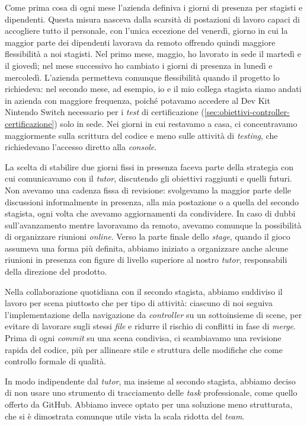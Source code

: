 Come prima cosa di ogni mese l'azienda definiva i giorni di presenza per stagisti e dipendenti. Questa misura nasceva dalla scarsità di postazioni di lavoro capaci di accogliere tutto il personale, con l'unica eccezione del venerdì, giorno in cui la maggior parte dei dipendenti lavorava da remoto offrendo quindi maggiore flessibilità a noi stagisti. Nel primo mese, maggio, ho lavorato in sede il martedì e il giovedì; nel mese successivo ho cambiato i giorni di presenza in lunedì e mercoledì. L'azienda permetteva comunque flessibilità quando il progetto lo richiedeva: nel secondo mese, ad esempio, io e il mio collega stagista siamo andati in azienda con maggiore frequenza, poiché potavamo accedere al Dev Kit Nintendo Switch necessario per i \textit{test} di certificazione (\ref{sec:obiettivi-controller-certificazione}) solo in sede. Nei giorni in cui restavamo a casa, ci concentravamo maggiormente sulla scrittura del codice e meno sulle attività di \textit{testing}, che richiedevano l'accesso diretto alla \textit{console}.
 
La scelta di stabilire due giorni fissi in presenza faceva parte della strategia con cui comunicavamo con il \textit{tutor}, discutendo gli obiettivi raggiunti e quelli futuri. Non avevamo una cadenza fissa di revisione: svolgevamo la maggior parte delle discussioni informalmente in presenza, alla mia postazione o a quella del secondo stagista, ogni volta che avevamo aggiornamenti da condividere. In caso di dubbi sull'avanzamento mentre lavoravamo da remoto, avevamo comunque la possibilità di organizzare riunioni \textit{online}. Verso la parte finale dello \textit{stage}, quando il gioco assumeva una forma più definita, abbiamo iniziato a organizzare anche alcune riunioni in presenza con figure di livello superiore al nostro \textit{tutor}, responsabili della direzione del prodotto.
 
Nella collaborazione quotidiana con il secondo stagista, abbiamo suddiviso il lavoro per scena piuttosto che per tipo di attività: ciascuno di noi seguiva l'implementazione della navigazione da \textit{controller} su un sottoinsieme di scene, per evitare di lavorare sugli stessi \textit{file} e ridurre il rischio di conflitti in fase di \textit{merge}. Prima di ogni \textit{commit} su una scena condivisa, ci scambiavamo una revisione rapida del codice, più per allineare stile e struttura delle modifiche che come controllo formale di qualità.
 
In modo indipendente dal \textit{tutor}, ma insieme al secondo stagista, abbiamo deciso di non usare uno strumento di tracciamento delle \textit{task} professionale, come quello offerto da GitHub. Abbiamo invece optato per una soluzione meno strutturata, che si è dimostrata comunque utile vista la scala ridotta del \textit{team}.
 
